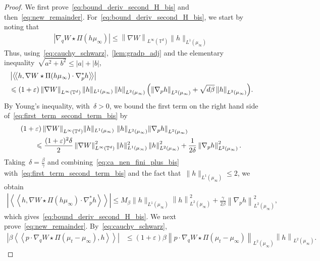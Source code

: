 \documentclass[onefignum,onetabnum]{siamart251216} %
\newcommand{\norm}[1]{\left\lVert#1\right\rVert}
\newcommand{\torus}{\mathbb T}
\newcommand{\mc}[1]{\mathcal{#1}}
\renewcommand{\leq}{\leqslant}
\newcommand{\mescin}{\mu}
\newcommand{\normT}[1]{\norm{#1}_{L^\infty(\torus^d)}}
\newcommand{\projp}{\Pi}
\newcommand{\dblangle}[1]{\left\langle\!\left\langle #1 \right\rangle\!\right\rangle}
\newcommand{\norml}[1]{\norm{#1}_{L^2(\mescin_\infty)}}
\newcommand{\eps}{\varepsilon}
\theoremstyle{plain}
\numberwithin{equation}{section}
\numberwithin{theorem}{section}
\begin{document}
\begin{proof}
    We first prove~\eqref{eq:bound_deriv_second_H_bis} and then~\eqref{eq:new_remainder}.
For~\eqref{eq:bound_deriv_second_H_bis}, we start by noting that
\begin{align}
    \label{eq:bound_convolution}
    \left|\nabla_q W\star\projp(h\mescin_\infty)\right|
    \leq \normT{\nabla W} \|h\|_{L^1(\mescin_\infty)} %
\end{align}
Thus, using~\eqref{eq:cauchy_schwarz},~\cref{lem:gradp_adj} and the elementary inequality~$\sqrt{a^2 + b^2}\leq |a| + |b|$,
\begin{align}
    \label{eq:first_term_second_term_bis}
    &\left|\dblangle{h,\nabla W\star\projp(h\mescin_\infty)\cdot \nabla_p^* h}\right| \\
    \notag
    &\leq (1+\eps)\normT{\nabla W}\|h\|_{L^1(\mescin_\infty)}\norml{h}
    \left(\norml{\nabla_p h}+\sqrt{d\beta}\norml{h}\right)\!.
\end{align}
By Young's inequality,
with~$\delta >0$,
we bound the first term on the right hand side of~\eqref{eq:first_term_second_term_bis} by
\begin{align}
    \label{eq:ca_nen_fini_plus_bis}
    &(1+\eps)\normT{\nabla W}\!\|h\|_{L^1(\mescin_\infty)}\,\norml{h}\!\norml{\nabla_p h} \\
    \notag
    &\qquad\leq \frac{(1+\eps)^2\delta}{2}\normT{\nabla W}^2\|h\|_{L^1(\mescin_\infty)}^2\norml{h}^2
    +\frac{1}{2\delta}\norml{\nabla_p h}^2.
\end{align}
Taking~$\delta = \frac{\beta}{\gamma}$ and combining~\eqref{eq:ca_nen_fini_plus_bis} with~\eqref{eq:first_term_second_term_bis} and the fact that~$\|h\|_{L^1(\mescin_\infty)} \leq 2$, we obtain
\begin{align*}
    \!\left|\dblangle{h,\nabla W\star\projp(h\mescin_\infty)\cdot \nabla_p^* h}\right|\!
    \leq M_\beta\|h\|_{L^1(\mescin_\infty)}\norml{h}^2
    + \frac{\gamma}{2\beta}\norml{\nabla_p h}^2,
\end{align*}
which gives~\eqref{eq:bound_deriv_second_H_bis}.
We next prove~\eqref{eq:new_remainder}. By~\eqref{eq:cauchy_schwarz},
\begin{align*}
    \left|\beta\dblangle{ p\cdot\nabla_q W \star \projp (\mescin_t - \mescin_\infty), h}\right|
    &\leq (1+\eps)\beta\norml{p\cdot\nabla_q W \star \projp (\mescin_t - \mescin_\infty)}\norml{h}.

\end{align*}
\end{proof}
\end{document}
